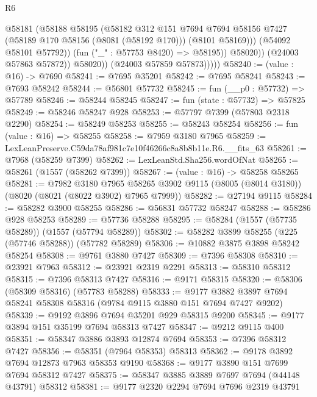 \begin{lexlean}{R6}
\begin{coremodule}
                        @58181
                          (@58188
                            @58195
                            (@58182
                              @312
                              @151
                              @7694
                              @7694
                              @58156
                              @7427
                              (@58189 @170 @58156 (@8081 (@58192 @170)))
                              (@8101 @58169)))
                          (@54092 @58101 @57792))
                        (fun ("_" : @57753 @8420) => @58195))
                      @58020))
                  (@24003 @57863 @57872))
                @58020))
            (@24003 @57859 @57873)))))
@58240 := (value : @16) -> @7690
@58241 := @7695 @35201
@58242 := @7695 @58241
@58243 := @7693 @58242
@58244 := @56801 @57732
@58245 := fun (__p0 : @57732) => @57789
@58246 := @58244 @58245
@58247 := fun (state : @57732) => @57825
@58249 := @58246 @58247 @928
@58253 := @57797 @7399 (@57803 @2318 @2290)
@58254 := @58249 @58253
@58255 := @58243 @58254
@58256 := fun (value : @16) => @58255
@58258 := @7959 @3180 @7965
@58259 := LexLeanPreserve.C59da78af981c7e10f46266c8a8b8b11e.R6.__fits_63
@58261 := @7968 (@58259 @7399)
@58262 := LexLeanStd.Sha256.wordOfNat
@58265 := @58261 (@1557 (@58262 @7399))
@58267 := (value : @16) -> @58258 @58265
@58281 := @7982
    @3180
    @7965
    @58265
    @3902
    @9115
    (@8005 (@8014 @3180))
    (@8020 (@8021 (@8022 @3902) @7965 @7999))
@58282 := @27194 @9115
@58284 := @58282 @3900 @58255
@58286 := @56831 @57732 @58247
@58288 := @58286 @928 @58253
@58289 := @57736 @58288
@58295 := @58284 (@1557 (@57735 @58289)) (@1557 (@57794 @58289))
@58302 := @58282 @3899 @58255 (@225 (@57746 @58288)) (@57782 @58289)
@58306 := @10882 @3875 @3898 @58242 @58254
@58308 := @9761 @3880 @7427
@58309 := @7396 @58308
@58310 := @23921 @7963
@58312 := @23921 @2319 @2291
@58313 := @58310 @58312
@58315 := @7396 @58313 @7427
@58316 := @9171 @58315
@58320 := @58306 (@58309 @58316) (@57783 @58288)
@58333 := @9177 @3882 @3897 @7694 @58241 @58308 @58316 (@9784 @9115 @3880 @151 @7694 @7427 @9202)
@58339 := @9192 @3896 @7694 @35201 @929 @58315 @9200
@58345 := @9177 @3894 @151 @35199 @7694 @58313 @7427
@58347 := @9212 @9115 @400
@58351 := @58347 @3886 @3893 @12874 @7694
@58353 := @7396 @58312 @7427
@58356 := @58351 (@7964 @58353) @58313
@58362 := @9178 @3892 @7694 @12873 @7963 @58353 @9190
@58368 := @9177 @3890 @151 @7699 @7694 @58312 @7427
@58375 := @58347 @3885 @3889 @7697 @7694 (@44148 @43791) @58312
@58381 := @9177 @2320 @2294 @7694 @7696 @2319 @43791

\end{coremodule}
\end{lexlean}
